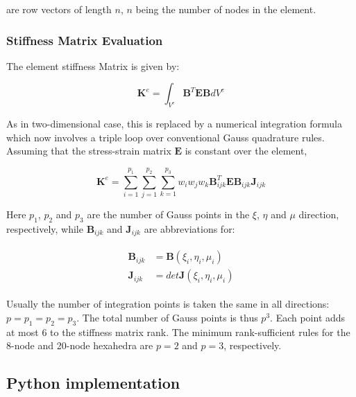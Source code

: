 \documentclass[10pt,b5paper,titlepage]{book}
\newcommand{\m}{\mathbf}
\newenvironment{eqarray}
{
    \begin{eqnarray}
        \begin{aligned}
}
{
        \end{aligned}
    \end{eqnarray}
}
\begin{document}
are row vectors of length $ n $, $ n $ being the number of nodes in the element.



\subsubsection{Stiffness Matrix Evaluation}

The element stiffness Matrix is given by:

\begin{equation}
    \m{K}^e = \int_{V^e} \m{B}^T \m{E} \m{B} dV^e
\end{equation}

As in two-dimensional case, this is replaced by a numerical integration formula which
now involves a triple loop over conventional Gauss quadrature rules. Assuming that
the stress-strain matrix $ \m{E} $ is constant over the element,

\begin{equation}
    \m{K}^e = \sum_{i=1}^{p_1} \sum_{j=1}^{p_2} \sum_{k=1}^{p_3}
    w_i w_j w_k \m{B}_{ijk}^T \m{E} \m{B}_{ijk} \m{J}_{ijk}
\end{equation}

Here $ p_1 $, $ p_2 $ and $ p_3 $ are the number of Gauss points in the $ \xi $,
$ \eta $ and $ \mu $ direction, respectively, while $ \m{B}_{ijk} $
and $ \m{J}_{ijk} $ are abbreviations for:

\begin{eqarray}
    \m{B}_{ijk} &= \m{B} \left(\xi_i, \eta_i, \mu_i\right) \\
    \m{J}_{ijk} &= det \m{J} \left(\xi_i, \eta_i, \mu_i\right)
\end{eqarray}

Usually the number of integration points is taken the same in all directions:
$ p = p_1 = p_2 = p_3 $. The total number of Gauss points is thus $ p^3 $.
Each point adds at most 6 to the stiffness matrix rank. The minimum rank-sufficient
rules for the 8-node and 20-node hexahedra are $ p = 2 $ and $ p = 3 $, respectively.


\subsection{Python implementation}
\end{document}
